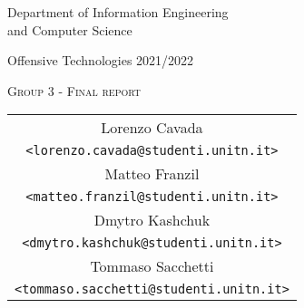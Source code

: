\pagestyle{plain}

\thispagestyle{empty}

\begin{center}
    \begin{figure}[h!]
        \centerline{}
    \end{figure}
    
    \vspace{4 cm}
    
    \LARGE{Department of Information Engineering\\and Computer Science}
    
    \vspace{1 cm}
    \Large{Offensive Technologies 2021/2022}
    
    \vspace{2 cm} 
    {\Huge \textsc{Group 3 - Final report}}
    
    \vspace{1 cm}

    \begin{tabular*}{0.6\textwidth}{c}
        Lorenzo Cavada \\
        \texttt{<lorenzo.cavada@studenti.unitn.it>} \medskip \\
        Matteo Franzil \\
        \texttt{<matteo.franzil@studenti.unitn.it>} \medskip \\
        Dmytro Kashchuk \\
        \texttt{<dmytro.kashchuk@studenti.unitn.it>} \medskip \\
        Tommaso Sacchetti\\
        \texttt{<tommaso.sacchetti@studenti.unitn.it>}
    \end{tabular*}
    
    \vspace{2 cm}
    
\end{center}

\clearpage